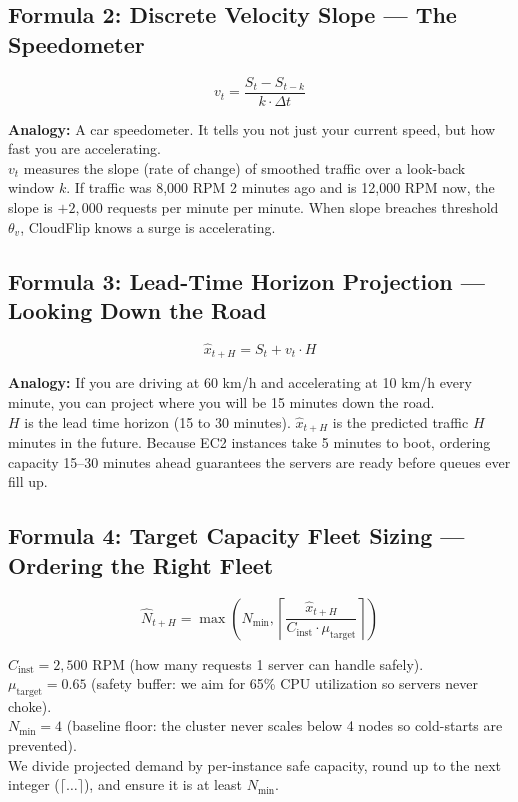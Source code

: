 \documentclass[11pt,letterpaper]{article}
\begin{document}
\subsection{Formula 2: Discrete Velocity Slope --- The Speedometer}
\begin{equation}
v_t = \frac{S_t - S_{t-k}}{k \cdot \Delta t}
\end{equation}
\begin{tcolorbox}[title=Intuition \& Why We Use It]
\textbf{Analogy:} A car speedometer. It tells you not just your current speed, but how fast you are accelerating. \\
$v_t$ measures the slope (rate of change) of smoothed traffic over a look-back window $k$. If traffic was 8,000 RPM 2 minutes ago and is 12,000 RPM now, the slope is $+2,000$ requests per minute per minute. When slope breaches threshold $\theta_v$, CloudFlip knows a surge is accelerating.
\end{tcolorbox}

\subsection{Formula 3: Lead-Time Horizon Projection --- Looking Down the Road}
\begin{equation}
\hat{x}_{t+H} = S_t + v_t \cdot H
\end{equation}
\begin{tcolorbox}[title=Intuition \& Why We Use It]
\textbf{Analogy:} If you are driving at 60 km/h and accelerating at 10 km/h every minute, you can project where you will be 15 minutes down the road. \\
$H$ is the lead time horizon (15 to 30 minutes). $\hat{x}_{t+H}$ is the predicted traffic $H$ minutes in the future. Because EC2 instances take 5 minutes to boot, ordering capacity 15--30 minutes ahead guarantees the servers are ready before queues ever fill up.
\end{tcolorbox}

\subsection{Formula 4: Target Capacity Fleet Sizing --- Ordering the Right Fleet}
\begin{equation}
\hat{N}_{t+H} = \max\left( N_{\min}, \left\lceil \frac{\hat{x}_{t+H}}{C_{\text{inst}} \cdot \mu_{\text{target}}} \right\rceil \right)
\end{equation}
\begin{tcolorbox}[title=Intuition \& Why We Use It]
$C_{\text{inst}} = 2,500$ RPM (how many requests 1 server can handle safely). \\
$\mu_{\text{target}} = 0.65$ (safety buffer: we aim for 65\% CPU utilization so servers never choke). \\
$N_{\min} = 4$ (baseline floor: the cluster never scales below 4 nodes so cold-starts are prevented). \\
We divide projected demand by per-instance safe capacity, round up to the next integer ($\lceil \dots \rceil$), and ensure it is at least $N_{\min}$.
\end{tcolorbox}
\end{document}
